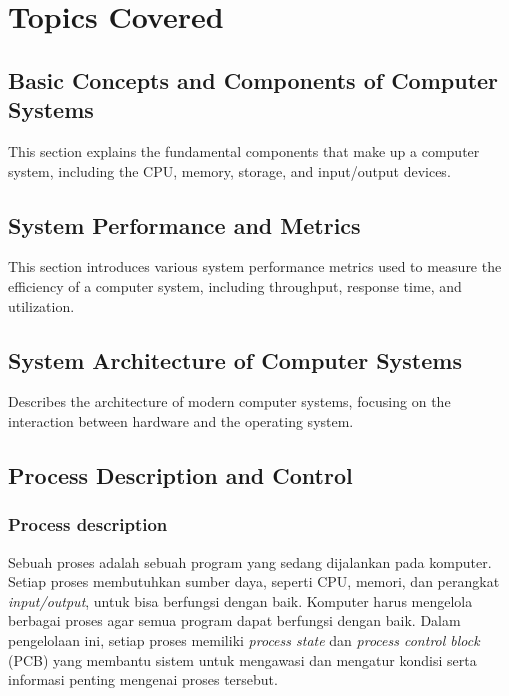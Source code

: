 \documentclass[12pt]{article}
\begin{document}
\section{Topics Covered}

\subsection{Basic Concepts and Components of Computer Systems}
This section explains the fundamental components that make up a computer system, including the CPU, memory, storage, and input/output devices.

\subsection{System Performance and Metrics}
This section introduces various system performance metrics used to measure the efficiency of a computer system, including throughput, response time, and utilization.

\subsection{System Architecture of Computer Systems}
Describes the architecture of modern computer systems, focusing on the interaction between hardware and the operating system.

\subsection{Process Description and Control}
\subsubsection{Process description}
Sebuah proses adalah sebuah program yang sedang dijalankan pada komputer. Setiap proses membutuhkan sumber daya, seperti CPU, memori, dan perangkat \textit{input/output}, untuk bisa berfungsi dengan baik. Komputer harus mengelola berbagai proses agar semua program dapat berfungsi dengan baik. Dalam pengelolaan ini, setiap proses memiliki \textit{process state} dan \textit{process control block} (PCB) yang membantu sistem untuk mengawasi dan mengatur kondisi serta informasi penting mengenai proses tersebut.
\end{document}
